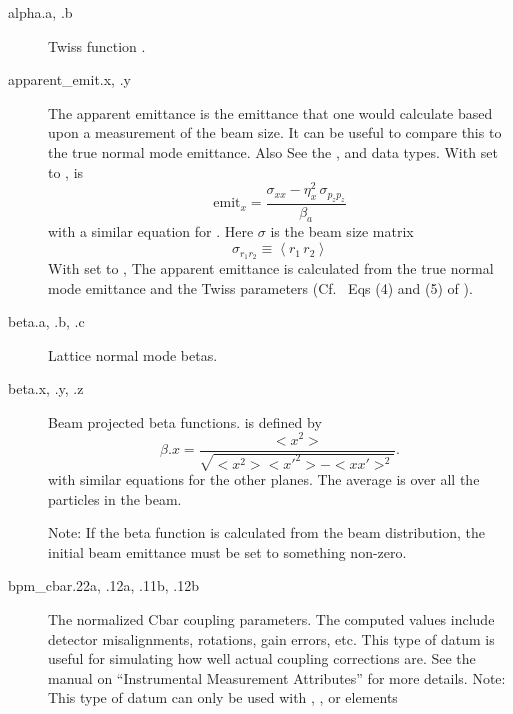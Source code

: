   \begin{description}
  \item[alpha.a, .b] \Newline {}
Twiss function .
  \item[apparent_emit.x, .y] \Newline {}
The apparent emittance is the emittance that one would calculate based
upon a measurement of the beam size\cite{b:emit}. It can be useful to
compare this to the true normal mode emittance. Also See the
,  and  data types.
With  set to ,  is
\begin{equation}
  \text{emit}_x = \frac{\sigma_{xx} - \eta_x^2 \, \sigma_{p_zp_z}}{\beta_a}
\end{equation}
with a similar equation for . Here $\sigma$ is the beam size matrix
\begin{equation}
  \sigma_{r_1r_2} \equiv \left< r_1 \, r_2 \right>
\end{equation}
With  set to , The apparent emittance is
calculated from the true normal mode emittance and the Twiss
parameters (Cf.~ Eqs (4) and (5) of \cite{b:emit}).

  \item[beta.a, .b, .c] \Newline {}
Lattice normal mode betas.

  \item[beta.x, .y, .z] \Newline {}
Beam projected beta functions.  is defined by
\begin{equation}
  \beta.x = \frac{<x^{2}>}{\sqrt{<x^{2}> <x'^{2}> - <x x'>^{2}}}.
\end{equation}
with similar equations for the other planes.
The average \vn{<>} is over all the particles in the beam.

Note: If the beta function is calculated from the beam distribution,
the initial beam emittance must be set to something non-zero.

  \item[bpm_cbar.22a, .12a, .11b, .12b] \Newline {}
The normalized Cbar coupling parameters. The computed  values include detector
misalignments, rotations, gain errors, etc. This type of datum is useful for simulating how well
actual coupling corrections are. See the \bmad manual on ``Instrumental Measurement Attributes'' for
more details.  Note: This type of datum can only be used with , ,
 or  elements


\end{description}

